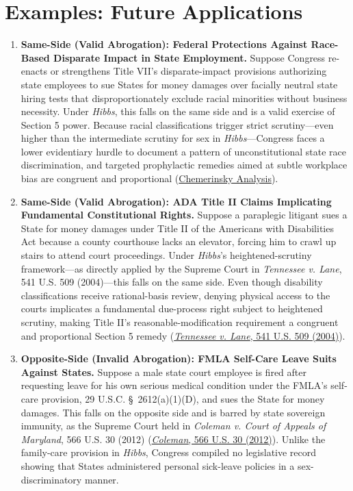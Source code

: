 \documentclass[12pt]{article}
\begin{document}
\section{Examples: Future Applications}
\begin{enumerate}
\item \textbf{Same-Side (Valid Abrogation): Federal Protections Against Race-Based Disparate Impact in State Employment.} Suppose Congress re-enacts or strengthens Title VII's disparate-impact provisions authorizing state employees to sue States for money damages over facially neutral state hiring tests that disproportionately exclude racial minorities without business necessity. Under \textit{Hibbs}, this falls on the same side and is a valid exercise of Section 5 power. Because racial classifications trigger strict scrutiny---even higher than the intermediate scrutiny for sex in \textit{Hibbs}---Congress faces a lower evidentiary hurdle to document a pattern of unconstitutional state race discrimination, and targeted prophylactic remedies aimed at subtle workplace bias are congruent and proportional (\href{https://openscholarship.wustl.edu/cgi/viewcontent.cgi?referer=&httpsredir=1&article=1395&context=law_journal_law_policy}{Chemerinsky Analysis}).

\item \textbf{Same-Side (Valid Abrogation): ADA Title II Claims Implicating Fundamental Constitutional Rights.} Suppose a paraplegic litigant sues a State for money damages under Title II of the Americans with Disabilities Act because a county courthouse lacks an elevator, forcing him to crawl up stairs to attend court proceedings. Under \textit{Hibbs}'s heightened-scrutiny framework---as directly applied by the Supreme Court in \textit{Tennessee v. Lane}, 541 U.S. 509 (2004)---this falls on the same side. Even though disability classifications receive rational-basis review, denying physical access to the courts implicates a fundamental due-process right subject to heightened scrutiny, making Title II's reasonable-modification requirement a congruent and proportional Section 5 remedy (\href{https://supreme.justia.com/cases/federal/us/541/509/}{\textit{Tennessee v. Lane}, 541 U.S. 509 (2004)}).

\item \textbf{Opposite-Side (Invalid Abrogation): FMLA Self-Care Leave Suits Against States.} Suppose a male state court employee is fired after requesting leave for his own serious medical condition under the FMLA's self-care provision, 29 U.S.C. \S~2612(a)(1)(D), and sues the State for money damages. This falls on the opposite side and is barred by state sovereign immunity, as the Supreme Court held in \textit{Coleman v. Court of Appeals of Maryland}, 566 U.S. 30 (2012) (\href{https://supreme.justia.com/cases/federal/us/566/30/}{\textit{Coleman}, 566 U.S. 30 (2012)}). Unlike the family-care provision in \textit{Hibbs}, Congress compiled no legislative record showing that States administered personal sick-leave policies in a sex-discriminatory manner.


\end{enumerate}
\end{document}
